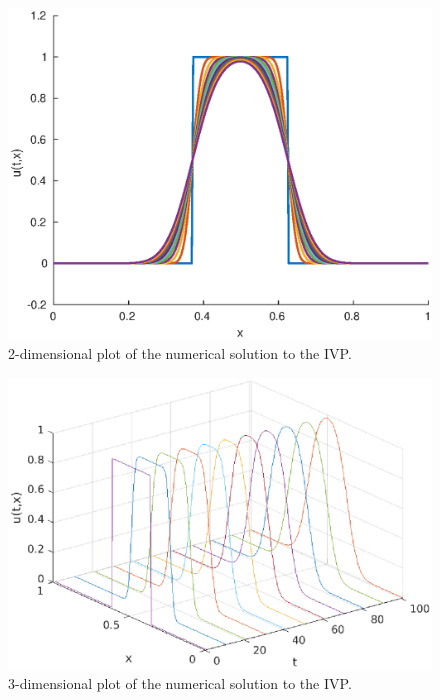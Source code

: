 \documentclass[11pt]{article}
\begin{document}
\newpage
\begin{figure}[ht]
	\centering
	\includegraphics{heat_eq_2d}
	\caption{2-dimensional plot of the numerical solution to the IVP.}
\end{figure}
\newpage
\begin{figure}[ht]
	\centering
	\includegraphics{heat_eq_3d}
	\caption{3-dimensional plot of the numerical solution to the IVP.}
\end{figure}
\newpage
\printbibliography
\end{document}
